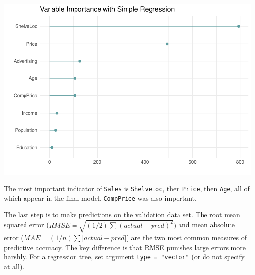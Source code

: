 \documentclass[
]{book}
\newenvironment{Shaded}{\begin{snugshade}}{\end{snugshade}}
\newcommand{\DataTypeTok}[1]{\textcolor[rgb]{0.13,0.29,0.53}{#1}}
\newcommand{\DecValTok}[1]{\textcolor[rgb]{0.00,0.00,0.81}{#1}}
\newcommand{\KeywordTok}[1]{\textcolor[rgb]{0.13,0.29,0.53}{\textbf{#1}}}
\newcommand{\NormalTok}[1]{#1}
\newcommand{\OperatorTok}[1]{\textcolor[rgb]{0.81,0.36,0.00}{\textbf{#1}}}
\newcommand{\StringTok}[1]{\textcolor[rgb]{0.31,0.60,0.02}{#1}}
\begin{document}
\includegraphics{data-sci_files/figure-latex/unnamed-chunk-102-1.pdf}

The most important indicator of \texttt{Sales} is \texttt{ShelveLoc}, then \texttt{Price}, then \texttt{Age}, all of which appear in the final model. \texttt{CompPrice} was also important.

The last step is to make predictions on the validation data set. The root mean squared error (\(RMSE = \sqrt{(1/2) \sum{(actual - pred)^2}})\) and mean absolute error (\(MAE = (1/n) \sum{|actual - pred|}\)) are the two most common measures of predictive accuracy. The key difference is that RMSE punishes large errors more harshly. For a regression tree, set argument \texttt{type\ =\ "vector"} (or do not specify at all).

\begin{Shaded}
\end{Shaded}
\end{document}
